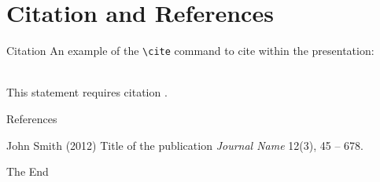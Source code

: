 \documentclass{beamer}
\begin{document}
\section{Citation and References}
\begin{frame}[fragile] %
{Citation}
An example of the \verb|\cite| command to cite within the presentation:\\~

This statement requires citation \cite{p1}.
\end{frame}

\begin{frame}
{References}
\footnotesize{
\begin{thebibliography}{99} %
 John Smith (2012)
\newblock Title of the publication
\newblock \emph{Journal Name} 12(3), 45 -- 678.
\end{thebibliography}
}
\end{frame}


\begin{frame}
\Huge{\centerline{The End}}
\end{frame}

\end{document}
